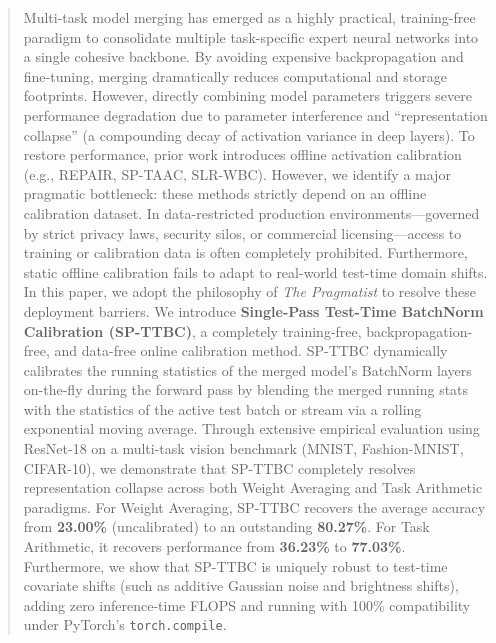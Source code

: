 \documentclass{article}
\theoremstyle{plain}
\theoremstyle{definition}
\theoremstyle{remark}
\begin{document}

\printAffiliationsAndNotice{}

\begin{abstract}
  Multi-task model merging has emerged as a highly practical, training-free paradigm to consolidate multiple task-specific expert neural networks into a single cohesive backbone. By avoiding expensive backpropagation and fine-tuning, merging dramatically reduces computational and storage footprints. However, directly combining model parameters triggers severe performance degradation due to parameter interference and ``representation collapse'' (a compounding decay of activation variance in deep layers). To restore performance, prior work introduces offline activation calibration (e.g., REPAIR, SP-TAAC, SLR-WBC). However, we identify a major pragmatic bottleneck: these methods strictly depend on an offline calibration dataset. In data-restricted production environments---governed by strict privacy laws, security silos, or commercial licensing---access to training or calibration data is often completely prohibited. Furthermore, static offline calibration fails to adapt to real-world test-time domain shifts. In this paper, we adopt the philosophy of \textit{The Pragmatist} to resolve these deployment barriers. We introduce \textbf{Single-Pass Test-Time BatchNorm Calibration (SP-TTBC)}, a completely training-free, backpropagation-free, and data-free online calibration method. SP-TTBC dynamically calibrates the running statistics of the merged model's BatchNorm layers on-the-fly during the forward pass by blending the merged running stats with the statistics of the active test batch or stream via a rolling exponential moving average. Through extensive empirical evaluation using ResNet-18 on a multi-task vision benchmark (MNIST, Fashion-MNIST, CIFAR-10), we demonstrate that SP-TTBC completely resolves representation collapse across both Weight Averaging and Task Arithmetic paradigms. For Weight Averaging, SP-TTBC recovers the average accuracy from \textbf{23.00\%} (uncalibrated) to an outstanding \textbf{80.27\%}. For Task Arithmetic, it recovers performance from \textbf{36.23\%} to \textbf{77.03\%}. Furthermore, we show that SP-TTBC is uniquely robust to test-time covariate shifts (such as additive Gaussian noise and brightness shifts), adding zero inference-time FLOPS and running with 100\% compatibility under PyTorch's \texttt{torch.compile}.
\end{abstract}
\end{document}
